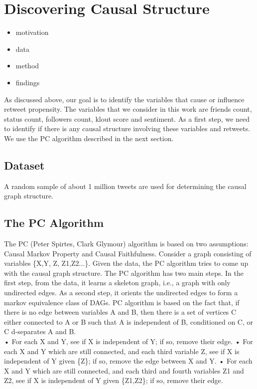 
\section{Discovering Causal Structure}
\begin{itemize}
\item motivation
\item data
\item method
\item findings
\end{itemize}


As discussed above, our goal is to identify the variables that cause or influence retweet propensity. The variables that we consider in this work are friends count, status count, followers count, klout score and sentiment. As a first step, we need to identify if there is any causal structure involving  these variables and retweets. We use the PC algorithm described in the next section. 
\subsection{Dataset}
A random sample of about 1 million tweets are used for determining the causal graph structure. 
\subsection{The PC Algorithm}
The PC (Peter Spirtes, Clark Glymour) algorithm is based on two assumptions: Causal Markov Property and Causal Faithfulness. Consider a graph consisting of variables \{X,Y, Z, Z1,Z2...\}. Given the data, the PC algorithm tries to come up with the causal graph structure. The PC algorithm has two main steps. In the first step, from the data, it learns a skeleton graph, i.e., a graph with only undirected edges. As a second step, it orients the undirected edges to form a markov equivalence class of DAGs. PC algorithm is based on the fact that, if there is no edge between variables A and B, then there is a set of vertices C either connected to A or B such that A is independent of B, conditioned on C, or C d-separates A and B. \\
• For each X and Y, see if X is independent of Y; if so, remove their edge.
• For each X and Y which are still connected, and each third variable Z, see if
X is independent of Y given \{Z\}; if so, remove the edge between X and Y.
• For each X and Y which are still connected, and each third and fourth variables
Z1 and Z2, see if X is independent of Y given \{Z1,Z2\}; if so, remove their edge.

